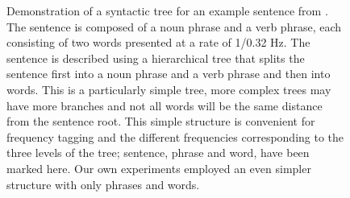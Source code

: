 \documentclass[10pt,letterpaper]{article}
\begin{document}
\begin{figure}[tb]
\begin{center}
\end{center}
\caption{Demonstration of a syntactic tree for an example sentence from \cite{DingEtAl2016, DingEtAl2017}. The sentence is composed of a noun phrase and a verb phrase, each consisting of two words presented at a rate of 1/0.32 Hz.  The sentence is described using a hierarchical tree that splits the sentence first into a noun phrase and a verb phrase and then into words. This is a particularly simple tree, more complex trees may have more branches and not all words will be the same distance from the sentence root. This simple structure is convenient for frequency tagging and the different frequencies corresponding to the three levels of the tree; sentence, phrase and word, have been marked here. Our own experiments employed an even simpler structure with only phrases and words.}
\label{fig:freq_tree}
\end{figure}
\end{document}
